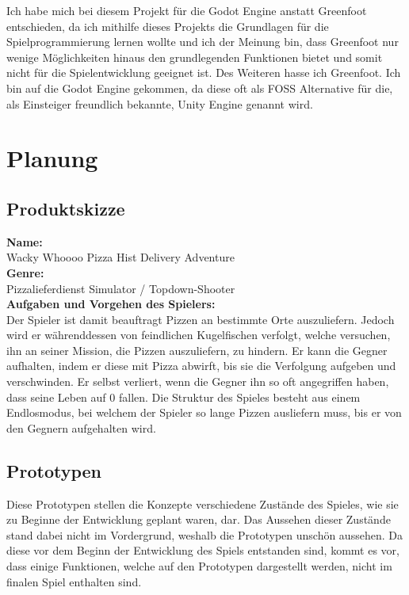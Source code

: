 \documentclass{article}
\begin{document}
	Ich habe mich bei diesem Projekt für die Godot Engine anstatt Greenfoot entschieden, da ich mithilfe dieses Projekts die Grundlagen für die Spielprogrammierung lernen wollte und ich der Meinung bin, dass Greenfoot nur wenige Möglichkeiten hinaus den grundlegenden Funktionen bietet und somit nicht für die Spielentwicklung geeignet ist. Des Weiteren hasse ich Greenfoot. Ich bin auf die Godot Engine gekommen, da diese oft als FOSS Alternative für die, als Einsteiger freundlich bekannte, Unity Engine genannt wird.

	\section{Planung}
	\subsection{Produktskizze}
	
	\textbf{Name:}\\
	Wacky Whoooo Pizza Hist Delivery Adventure\\
	\textbf{Genre:}\\
	Pizzalieferdienst Simulator / Topdown-Shooter\\
	\textbf{Aufgaben und Vorgehen des Spielers:}\\
	Der Spieler ist damit beauftragt Pizzen an bestimmte Orte auszuliefern. Jedoch wird er währenddessen von feindlichen Kugelfischen verfolgt, welche versuchen, ihn an seiner Mission, die Pizzen auszuliefern, zu hindern. Er kann die Gegner aufhalten, indem er diese mit Pizza abwirft, bis sie die Verfolgung aufgeben und verschwinden. Er selbst  verliert, wenn die Gegner ihn so oft angegriffen haben, dass seine Leben auf 0 fallen. Die Struktur des Spieles besteht aus einem Endlosmodus, bei welchem der Spieler so lange Pizzen ausliefern muss, bis er von den Gegnern aufgehalten wird.
	
	\subsection{Prototypen}
	
	Diese Prototypen stellen die Konzepte verschiedene Zustände des Spieles, wie sie zu Beginne der Entwicklung geplant waren, dar. Das Aussehen dieser Zustände stand dabei nicht im Vordergrund, weshalb die Prototypen unschön aussehen. Da diese vor dem Beginn der Entwicklung des Spiels entstanden sind, kommt es vor, dass einige Funktionen, welche auf den Prototypen dargestellt werden, nicht im finalen Spiel enthalten sind.
	
\end{document}
